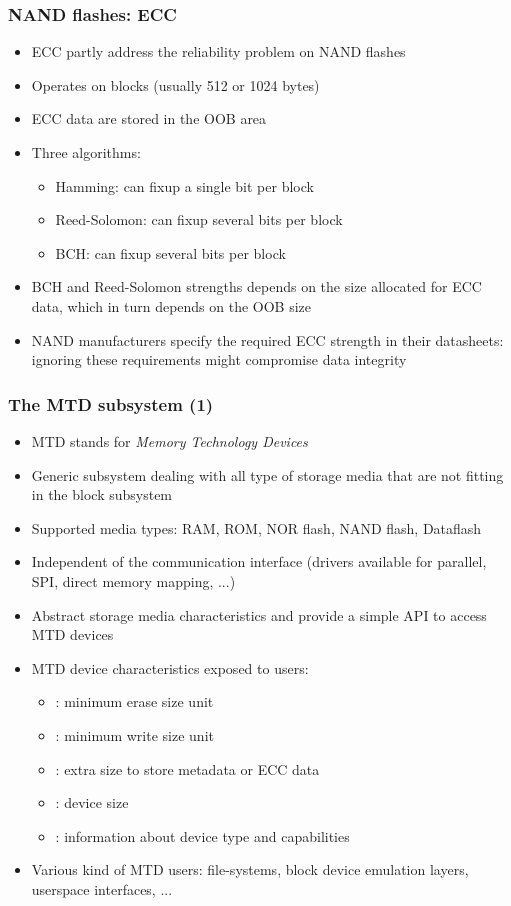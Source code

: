 \begin{frame}
  \frametitle{NAND flashes: ECC}
  \begin{itemize}
  \item ECC partly address the reliability problem on NAND flashes
  \item Operates on blocks (usually 512 or 1024 bytes)
  \item ECC data are stored in the OOB area
  \item Three algorithms:
    \begin{itemize}
    \item Hamming: can fixup a single bit per block
    \item Reed-Solomon: can fixup several bits per block
    \item BCH: can fixup several bits per block
    \end{itemize}
  \item BCH and Reed-Solomon strengths depends on the size allocated
    for ECC data, which in turn depends on the OOB size
  \item NAND manufacturers specify the required ECC strength in their
    datasheets: ignoring these requirements might compromise data
    integrity
  \end{itemize}
\end{frame}

\begin{frame}
  \frametitle{The MTD subsystem (1)}
  \begin{itemize}
  \item MTD stands for {\em Memory Technology Devices}
  \item Generic subsystem dealing with all type of storage media that
    are not fitting in the block subsystem
  \item Supported media types: RAM, ROM, NOR flash, NAND flash,
    Dataflash
  \item Independent of the communication interface (drivers available
    for parallel, SPI, direct memory mapping, ...)
  \item Abstract storage media characteristics and provide a simple
    API to access MTD devices
  \item MTD device characteristics exposed to users:
    \begin{itemize}
    \item {}: minimum erase size unit
    \item {}: minimum write size unit
    \item {}: extra size to store metadata or ECC data
    \item {}: device size
    \item {}: information about device type and capabilities
    \end{itemize}
  \item Various kind of MTD users: file-systems, block device emulation
    layers, userspace interfaces, ...
  \end{itemize}
\end{frame}

